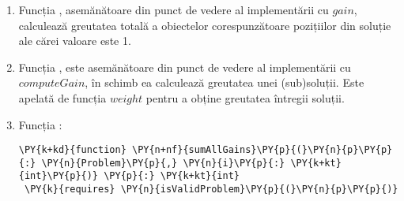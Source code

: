\begin{sloppypar}
\begin{enumerate}
\begin{Verbatim}[commandchars=\\\{\}]
  \PY{k}{requires} \PY{l+m+mi}{0} \PY{o}{\PYZlt{}=} \PY{o}{|}\PY{n}{solution}\PY{o}{|} \PY{o}{\PYZlt{}=} \PY{o}{|}\PY{n}{p}\PY{p}{.}\PY{n}{gains}\PY{o}{|}
  \PY{k}{ensures} \PY{n}{computeGain}\PY{p}{(}\PY{n}{p}\PY{p}{,} \PY{n}{solution}\PY{p}{,} \PY{n}{i}\PY{p}{)} \PY{o}{\PYZgt{}=} \PY{l+m+mi}{0}
\PY{p}{\PYZob{}}
  \PY{k}{if} \PY{n}{i} \PY{o}{==} \PY{l+m+mi}{0} \PY{k}{then} \PY{n}{solution}\PY{p}{[}\PY{l+m+mi}{0}\PY{p}{]} \PY{o}{*} \PY{n}{p}\PY{p}{.}\PY{n}{gains}\PY{p}{[}\PY{l+m+mi}{0}\PY{p}{]} \PY{k}{else} 
  \PY{n}{solution}\PY{p}{[}\PY{n}{i}\PY{p}{]} \PY{o}{*} \PY{n}{p}\PY{p}{.}\PY{n}{gains}\PY{p}{[}\PY{n}{i}\PY{p}{]} \PY{o}{+} \PY{n}{computeGain}\PY{p}{(}\PY{n}{p}\PY{p}{,} \PY{n}{solution}\PY{p}{,} \PY{n}{i} \PY{o}{\PYZhy{}} \PY{l+m+mi}{1}\PY{p}{)}
\PY{p}{\PYZcb{}}
\end{Verbatim}
    Spre deosebire de $gain$, poate primi o subsoluție al cărui profit se dorește a fi calculat prin specificarea unui index $i$ reprezentând poziția de la final spre început a subsoluției. Este apelată de funcția $gain$ pentru a obține câștigul întregii soluții și are o implementare recursivă a cărei finalitate este asigurată prin condiția $i == 0$. Această funcție oferă o informație în plus care nu reiese direct din definiția funcției, dar este adevărată, mai exact faptul că la finalul execuției rezultatul obținut va fi mereu pozitiv sau egal cu zero. Acest lucru este specificat folosind clauza \texttt{ensures}, iar adnotările de acest gen sunt numite  . Ele sunt expresii logice care trebuie să fie adevărate după executarea logicii unei funcții, metode sau leme.
    \item Funcția , asemănătoare din punct de vedere al implementării cu $gain$, calculează greutatea totală a obiectelor corespunzătoare pozițiilor din soluție ale cărei valoare este 1.
    \item Funcția , este asemănătoare din punct de vedere al implementării cu $computeGain$, în schimb ea calculează greutatea unei (sub)soluții. Este apelată de funcția $weight$ pentru a obține greutatea întregii soluții.
    \item Funcția :
    \begin{Verbatim}[commandchars=\\\{\}]
\PY{k+kd}{function} \PY{n+nf}{sumAllGains}\PY{p}{(}\PY{n}{p}\PY{p}{:} \PY{n}{Problem}\PY{p}{,} \PY{n}{i}\PY{p}{:} \PY{k+kt}{int}\PY{p}{)} \PY{p}{:} \PY{k+kt}{int}
 \PY{k}{requires} \PY{n}{isValidProblem}\PY{p}{(}\PY{n}{p}\PY{p}{)}

\end{Verbatim}
\end{enumerate}
\end{sloppypar}
